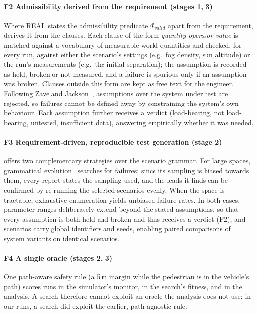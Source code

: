 \paragraph*{F2 Admissibility derived from the requirement (stages 1, 3)}
Where REAL states the admissibility predicate $\Phi_{\mathit{valid}}$ apart
from the requirement, \tool{} derives it from the  clauses.
Each clause of the form \emph{quantity operator value} is matched against a
vocabulary of measurable world quantities and checked, for every run, against
either the scenario's settings (e.g.\ fog density, sun altitude) or the run's
measurements (e.g.\ the initial separation); the assumption is recorded as
held, broken or not measured, and a failure is spurious only if an assumption
was broken. Clauses outside this form are kept as free text for the engineer.
Following Zave and Jackson~\cite{zave1997}, assumptions over the system under
test are rejected, so failures cannot be defined away by constraining the
system's own behaviour. Each assumption further receives a verdict
(load-bearing, not load-bearing, untested, insufficient data), answering
empirically whether it was needed.

\paragraph*{F3 Requirement-driven, reproducible test generation (stage 2)}
\tool{} offers two complementary strategies over the scenario grammar. For
large spaces, grammatical evolution~\cite{oneill2001,grape2022} searches for
failures; since its sampling is biased towards them, every report states the
sampling used, and the leads it finds can be confirmed by re-running the
selected scenarios evenly. When the space is tractable, exhaustive enumeration
yields unbiased failure rates. In both cases, parameter ranges deliberately
extend beyond the stated assumptions, so that every assumption is both held
and broken and thus receives a verdict (F2), and scenarios carry global
identifiers and seeds, enabling paired comparisons of system variants on
identical scenarios.

\paragraph*{F4 A single oracle (stages 2, 3)} One path-aware safety rule (a
5\,m margin while the pedestrian is in the vehicle's path) scores runs in the
simulator's monitor, in the search's fitness, and in the analysis. A search
therefore cannot exploit an oracle the analysis does not use; in our runs, a
search did exploit the earlier, path-agnostic rule.

